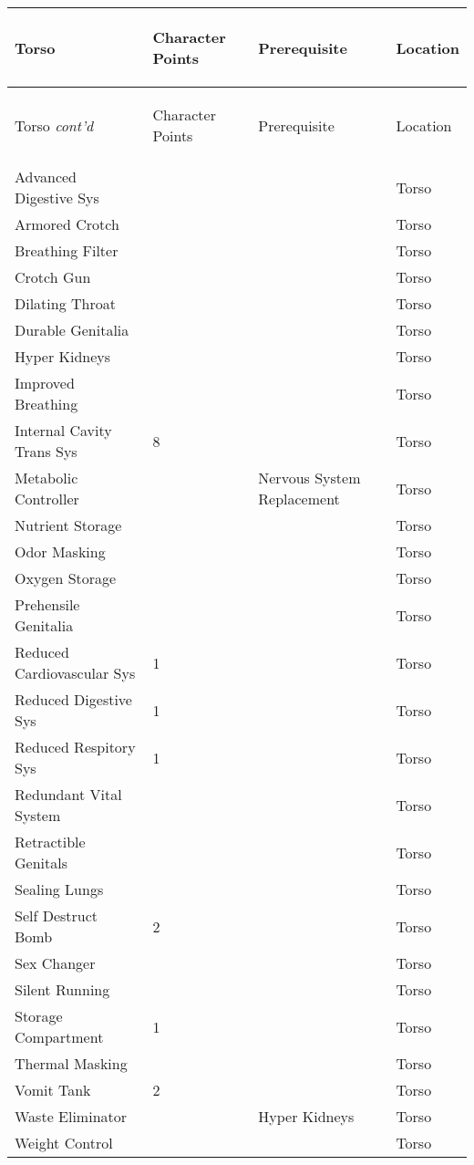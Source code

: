 \documentclass[twoside]{book}
\begin{document}
\begin{longtable}{p{1.25in}p{2em}ll} 
  Torso& \begin{turn}{70}{Character Points}\end{turn}
          & \begin{turn}{70}{Prerequisite}\end{turn}
          & \begin{turn}{70}{Location}\end{turn}
          \\
  \hline
  \hline
  \endfirsthead
  Torso \textit{cont'd}
        & \begin{turn}{70}{Character Points}\end{turn}
          & \begin{turn}{70}{Prerequisite}\end{turn}
          & \begin{turn}{70}{Location}\end{turn}
           \\
  \hline
  \endhead
\raggedright Advanced Digestive Sys &&& Torso \tabularnewline
      \raggedright Armored Crotch &&& Torso \tabularnewline
      \raggedright Breathing Filter &&& Torso \tabularnewline
      \raggedright Crotch Gun &&& Torso \tabularnewline
      \raggedright Dilating Throat &&& Torso \tabularnewline
      \raggedright Durable Genitalia &&& Torso \tabularnewline
      \raggedright Hyper Kidneys &&& Torso \tabularnewline
      \raggedright Improved Breathing &&& Torso \tabularnewline
      \raggedright Internal Cavity Trans Sys
           & 8 && Torso \tabularnewline
      \raggedright Metabolic Controller && Nervous System
           Replacement & Torso \tabularnewline
      \raggedright Nutrient Storage &&& Torso \tabularnewline
      \raggedright Odor Masking &&& Torso \tabularnewline
      \raggedright Oxygen Storage &&& Torso \tabularnewline
      \raggedright Prehensile Genitalia &&& Torso \tabularnewline
      \raggedright Reduced Cardiovascular Sys
           & 1 && Torso \tabularnewline
      \raggedright Reduced Digestive Sys & 1 && Torso \tabularnewline
      \raggedright Reduced Respitory Sys & 1 && Torso \tabularnewline
      \raggedright Redundant Vital System &&& Torso \tabularnewline
      \raggedright Retractible Genitals &&& Torso \tabularnewline
      \raggedright Sealing Lungs &&& Torso \tabularnewline
      \raggedright Self Destruct Bomb & 2 && Torso \tabularnewline
      \raggedright Sex Changer &&& Torso \tabularnewline
      \raggedright Silent Running &&& Torso \tabularnewline
      \raggedright Storage Compartment & 1 && Torso \tabularnewline
      \raggedright Thermal Masking &&& Torso \tabularnewline
      \raggedright Vomit Tank & 2 && Torso \tabularnewline
      \raggedright Waste Eliminator && Hyper Kidneys & Torso \tabularnewline
      \raggedright Weight Control &&& Torso \tabularnewline
      
\end{longtable}
    
\end{document}
